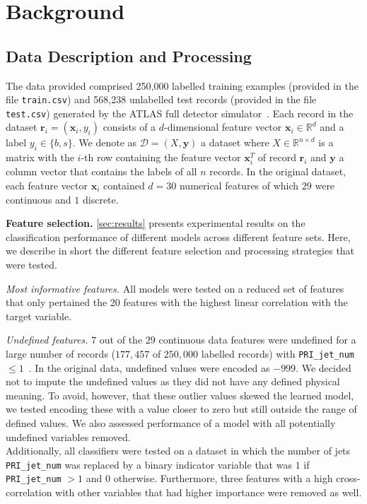 \documentclass[10pt,conference,compsocconf]{IEEEtran}
\newcommand{\parabf}[1]{\vspace{1mm}\noindent\textbf{#1}}
\newcommand{\parait}[1]{\vspace{1mm}\noindent\textit{#1}}
\newcommand{\Data}{\mathcal{D}}
\newcommand{\features}{\mathbf{x}_i}
\newcommand{\target}{y_i}
\newcommand{\targetset}{\{ b, s \}}
\newcommand{\targetvector}{\mathbf{y}}
\begin{document}
\section{Background}

\subsection{Data Description and Processing}
\label{sec:data}
The data provided comprised 250,000 labelled training examples (provided in the file \texttt{train.csv}) and 568,238 unlabelled test records (provided in the file \texttt{test.csv}) generated by the ATLAS full detector simulator~\cite{HiggsML}.
Each record in the dataset $\mathbf{r}_i = (\features, \target)$ consists of a $d$-dimensional feature vector $\features \in \mathbb{R}^d$ and a label $\target \in \targetset$. We denote as $\Data = (X, \targetvector)$ a dataset where $X \in \mathbb{R}^{n \times d}$ is a matrix with the $i$-th row containing the feature vector $\features^T$ of record $\mathbf{r}_i$ and $\targetvector$ a column vector that contains the labels of all $n$ records.       
In the original dataset, each feature vector $\features$ contained $d=30$ numerical features of which $29$ were continuous and $1$ discrete.  

\parabf{Feature selection.} \autoref{sec:results} presents experimental results on the classification performance of different models across different feature sets. Here, we describe in short the different feature selection and processing strategies that were tested.

\parait{Most informative features.} All models were tested on a reduced set of features that only pertained the 20 features with the highest linear correlation with the target variable.

\parait{Undefined features.} $7$ out of the $29$ continuous data features were undefined for a large number of records ($177,457$ of $250,000$ labelled records) with \texttt{PRI\_jet\_num} $\leq 1$~\cite{OpenDataCERN}. In the original data, undefined values were encoded as $-999$. We decided not to impute the undefined values as they did not have any defined physical meaning. To avoid, however, that these outlier values skewed the learned model, we tested encoding these with a value closer to zero but still outside the range of defined values. We also assessed performance of a model with all potentially undefined variables removed.\\
Additionally, all classifiers were tested on a dataset in which the number of jets \texttt{PRI\_jet\_num} was replaced by a binary indicator variable that was $1$ if \texttt{PRI\_jet\_num} $>1$ and $0$ otherwise. Furthermore, three features with a high cross-correlation with other variables that had higher importance were removed as well. 
\end{document}
